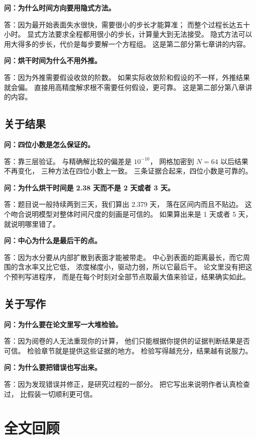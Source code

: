 \textbf{问：为什么时间方向要用隐式方法。}

答：因为最开始表面失水很快，需要很小的步长才能算准；
而整个过程长达五十小时。
显式方法要求全程都用很小的步长，计算量大到无法接受。
隐式方法可以用大得多的步长，代价是每步要解一个方程组。
这是第二部分第七章讲的内容。

\textbf{问：烘干时间为什么不用外推。}

答：因为外推需要假设收敛的阶数。
如果实际收敛阶和假设的不一样，外推结果就会偏。
直接用高精度解求根不需要任何假设，更可靠。
这是第二部分第八章讲的内容。

\subsection{关于结果}

\textbf{问：四位小数是怎么保证的。}

答：靠三层验证。
与精确解比较的偏差是 $10^{-10}$，
网格加密到 $N=64$ 以后结果不再变化，
三种方法在四位小数上一致。
三条证据合起来，四位小数是可靠的。

\textbf{问：为什么烘干时间是 2.38 天而不是 2 天或者 3 天。}

答：题目说一般持续两到三天，我们算出 2.379 天，
落在区间内而且不贴边。
这个吻合说明模型对整体时间尺度的刻画是可信的。
如果算出来是 1 天或者 5 天，就说明哪里错了。

\textbf{问：中心为什么是最后干的点。}

答：因为水分要从内部扩散到表面才能被带走。
中心到表面的距离最长，而它周围的含水率又比它低，
浓度梯度小，驱动力弱，所以它最后干。
论文里没有把这个预判写进程序，
而是在每个时刻对全部节点取最大值来验证，结果确实如此。

\subsection{关于写作}

\textbf{问：为什么要在论文里写一大堆检验。}

答：因为阅卷的人无法重现你的计算，
他们只能根据你提供的证据判断结果是否可信。
检验章节就是提供这些证据的地方。
检验写得越充分，结果越有说服力。

\textbf{问：为什么要把错误也写出来。}

答：因为发现错误并修正，是研究过程的一部分。
把它写出来说明作者认真检查过，
比假装一切顺利更可信。

\section{全文回顾}

